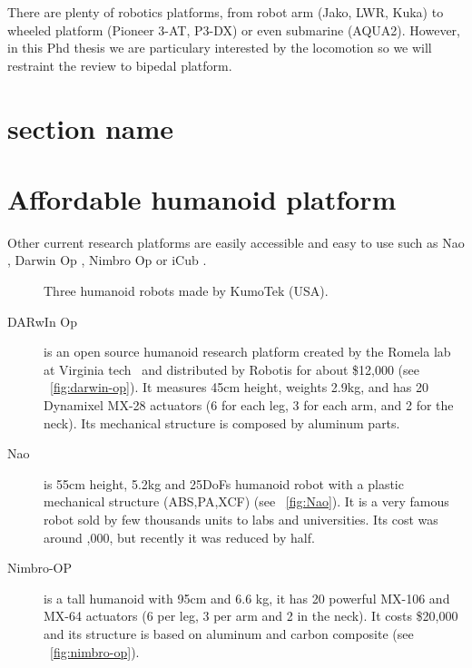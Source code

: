 There are plenty of robotics platforms, from robot arm (Jako, LWR, Kuka) to wheeled platform (Pioneer 3-AT, P3-DX) or even submarine (AQUA2). However, in this Phd thesis we are particulary interested by the locomotion so we will restraint the review to bipedal platform.


\section{section name} %
\label{sec:section_name}



\section{Affordable humanoid platform} %
\label{sec:affordable_humanoid_platform}

Other current research platforms are easily accessible and easy to use such as Nao \cite{gouaillier2008nao}, Darwin Op \cite{ha2011development}, Nimbro Op \cite{schwarznimbro} or iCub \cite{metta2008icub}.

\begin{figure}[tb]
\centering
    \hfil
    \hfil
    \caption{Three humanoid robots made by KumoTek (USA).}
    \label{fig:kumotek_robots}
\end{figure}


\begin{description}
    \item[DARwIn Op] is an open source humanoid research platform created by the Romela lab at Virginia tech~\parencite{ha2011development} and distributed by Robotis for about \$12,000 (see \figurename~\ref{fig:darwin-op}). It measures 45cm height, weights 2.9kg, and has 20 Dynamixel MX-28 actuators (6 for each leg, 3 for each arm, and 2 for the neck). Its mechanical structure is composed by aluminum parts.
    \item[Nao] is 55cm height, 5.2kg and 25DoFs humanoid robot with a plastic mechanical structure (ABS,PA,XCF) (see \figurename~\ref{fig:Nao}). It is a very famous robot sold by few thousands units to labs and universities. Its cost was around ,000, but recently it was reduced by half.
    \item[Nimbro-OP] is a tall humanoid with 95cm and 6.6 kg, it has 20 powerful MX-106 and MX-64 actuators (6 per leg, 3 per arm and 2 in the neck). It costs \$20,000 and its structure is based on aluminum and carbon composite (see \figurename~\ref{fig:nimbro-op}).
\end{description}

